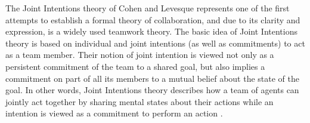 \documentclass[a4paper, 10pt]{article}
\begin{document}
\begin{small}

The Joint Intentions theory of Cohen and Levesque \cite{cohen:teamwork,
cohen:intention-commitment, cohen:persistence-intention-commitment,
cohen:intentions, levesque:acting-together} represents one of the first attempts
to establish a formal theory of collaboration, and due to its clarity and
expression, is a widely used teamwork theory. The basic idea of Joint Intentions
theory is based on individual and joint intentions (as well as commitments) to
act as a team member. Their notion of joint intention is viewed not only as a
persistent commitment of the team to a shared goal, but also implies a
commitment on part of all its members to a mutual belief about the state of the
goal. In other words, Joint Intentions theory describes how a team of agents can
jointly act together by sharing mental states about their actions while an
intention is viewed as a commitment to perform an action 
\cite{cohen:intention-commitment}.



\end{small}
\end{document}
